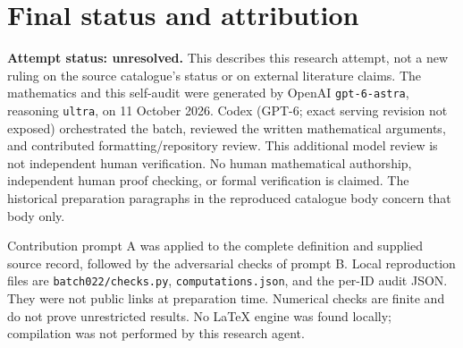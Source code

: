 \documentclass[11pt]{article}
\begin{document}
\section{Final status and attribution}
\textbf{Attempt status: unresolved.} This describes this research attempt, not a new ruling on the source catalogue's status or on external literature claims.
The mathematics and this self-audit were generated by OpenAI \texttt{gpt-6-astra}, reasoning \texttt{ultra}, on 11 October 2026. Codex (GPT-6; exact serving revision not exposed) orchestrated the batch, reviewed the written mathematical arguments, and contributed formatting/repository review. This additional model review is not independent human verification. No human mathematical authorship, independent human proof checking, or formal verification is claimed. The historical preparation paragraphs in the reproduced catalogue body concern that body only.

Contribution prompt A was applied to the complete definition and supplied source record, followed by the adversarial checks of prompt B. Local reproduction files are \texttt{batch022/checks.py}, \texttt{computations.json}, and the per-ID audit JSON. They were not public links at preparation time. Numerical checks are finite and do not prove unrestricted results. No LaTeX engine was found locally; compilation was not performed by this research agent.
\end{document}
